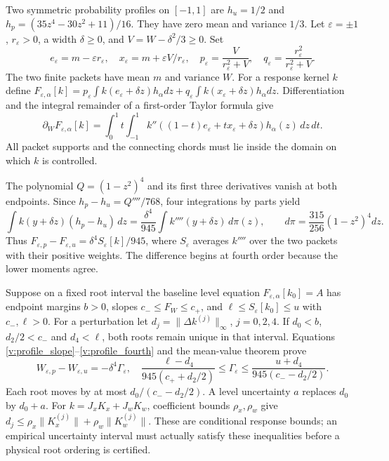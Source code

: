 Two symmetric probability profiles on $[-1,1]$ are
$h_u=1/2$ and $h_p=(35z^4-30z^2+11)/16$.
They have zero mean and variance $1/3$. Let $\varepsilon=\pm1$, $r_\varepsilon>0$, a width $\delta\ge0$, and $V=W-\delta^2/3\ge0$. Set
\begin{equation}
 e_\varepsilon=m-\varepsilon r_\varepsilon,\quad
 x_\varepsilon=m+\varepsilon V/r_\varepsilon,\quad
 p_\varepsilon=\frac{V}{r_\varepsilon^2+V},\quad
 q_\varepsilon=\frac{r_\varepsilon^2}{r_\varepsilon^2+V}.
 \label{v:profile_nodes}
\end{equation}
The two finite packets have mean $m$ and variance $W$. For a response kernel $k$ define
$F_{\varepsilon,\alpha}[k]=p_\varepsilon\int k(e_\varepsilon+\delta z)h_\alpha dz+
q_\varepsilon\int k(x_\varepsilon+\delta z)h_\alpha dz$.
Differentiation and the integral remainder of a first-order Taylor formula give
\begin{equation}
 \partial_WF_{\varepsilon,\alpha}[k]=
 \int_0^1t\int_{-1}^1
 k''((1-t)e_\varepsilon+tx_\varepsilon+\delta z)h_\alpha(z)\,dz\,dt.
 \label{v:profile_slope}
\end{equation}
All packet supports and the connecting chords must lie inside the domain on which $k$ is controlled.

The polynomial $Q=(1-z^2)^4$ and its first three derivatives vanish at both endpoints. Since $h_p-h_u=Q''''/768$, four integrations by parts yield
\begin{equation}
 \int k(y+\delta z)(h_p-h_u)\,dz
 =\frac{\delta^4}{945}\int k''''(y+\delta z)\,d\pi(z),
 \qquad d\pi=\frac{315}{256}(1-z^2)^4dz .
 \label{v:profile_fourth}
\end{equation}
Thus $F_{\varepsilon,p}-F_{\varepsilon,u}=\delta^4S_\varepsilon[k]/945$, where $S_\varepsilon$ averages $k''''$ over the two packets with their positive weights. The difference begins at fourth order because the lower moments agree.

Suppose on a fixed root interval the baseline level equation $F_{\varepsilon,\alpha}[k_0]=A$ has endpoint margins $b>0$, slopes $c_-\le F_W\le c_+$, and $\ell\le S_\varepsilon[k_0]\le u$ with $c_-,\ell>0$. For a perturbation let $d_j=\|\Delta k^{(j)}\|_\infty$, $j=0,2,4$. If
$d_0<b$, $d_2/2<c_-$ and $d_4<\ell$, both roots remain unique in that interval. Equations \eqref{v:profile_slope}--\eqref{v:profile_fourth} and the mean-value theorem prove
\begin{equation}
 W_{\varepsilon,p}-W_{\varepsilon,u}=-\delta^4\Gamma_\varepsilon,\quad
 \frac{\ell-d_4}{945(c_++d_2/2)}
 \le\Gamma_\varepsilon\le
 \frac{u+d_4}{945(c_--d_2/2)} .
 \label{v:profile_root_gap}
\end{equation}
Each root moves by at most $d_0/(c_--d_2/2)$. A level uncertainty $a$ replaces $d_0$ by $d_0+a$. For $k=J_xK_x+J_wK_w$, coefficient bounds $\rho_x,\rho_w$ give
$d_j\le\rho_x\|K_x^{(j)}\|+\rho_w\|K_w^{(j)}\|$. These are conditional response bounds; an empirical uncertainty interval must actually satisfy these inequalities before a physical root ordering is certified.

